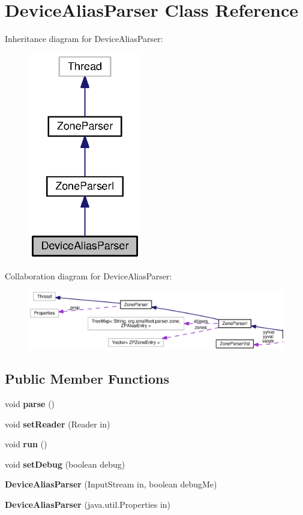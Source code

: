 \section{Device\+Alias\+Parser Class Reference}
\label{classorg_1_1smallfoot_1_1parser_1_1zone_1_1DeviceAliasParser}


Inheritance diagram for Device\+Alias\+Parser\+:\nopagebreak
\begin{figure}[H]
\begin{center}
\leavevmode
\includegraphics[width=140pt]{classorg_1_1smallfoot_1_1parser_1_1zone_1_1DeviceAliasParser__inherit__graph}
\end{center}
\end{figure}


Collaboration diagram for Device\+Alias\+Parser\+:
\nopagebreak
\begin{figure}[H]
\begin{center}
\leavevmode
\includegraphics[width=350pt]{classorg_1_1smallfoot_1_1parser_1_1zone_1_1DeviceAliasParser__coll__graph}
\end{center}
\end{figure}
\subsection*{Public Member Functions}
\begin{DoxyCompactItemize}
\item 
void {\bf parse} ()
\item 
void {\bf set\+Reader} (Reader in)
\item 
void {\bf run} ()
\item 
void {\bf set\+Debug} (boolean debug)
\item 
{\bf Device\+Alias\+Parser} (Input\+Stream in, boolean debug\+Me)
\item 
{\bf Device\+Alias\+Parser} (java.\+util.\+Properties in)
\end{DoxyCompactItemize}
